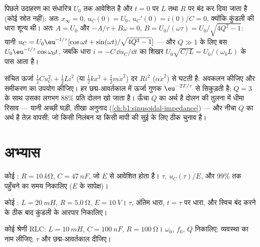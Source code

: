 \begin{example}[आरंभिक शर्तें]\label{ex:b1:transient-regimes:ic}
पिछले उदाहरण का संधारित्र $U_0$ तक आवेशित है और
$t = 0$ पर $L$ तथा $R$ पर बंद कर दिया जाता है (कोई स्रोत नहीं): अतः $x_\infty = 0$,
$u_C(0) = U_0$, $u_C'(0) = i(0)/C = 0$, क्योंकि कुंडली की धारा शून्य थी।
अतः $A = U_0$ और $-A/\tau + B\omega = 0$, $B = U_0/(\omega\tau) =
U_0/\sqrt{4Q^2 - 1}$: यानी $u_C = U_0\eu^{-t/\tau}[\cos\omega t + \sin(\omega
t)/\sqrt{4Q^2 - 1}]$ --- और $Q \gg 1$ के लिए बस $U_0\eu^{-t/\tau}\cos\omega_0 t$,
जबकि धारा $i = -C\,\dd u_C/\dd t$ का शिखर $U_0\sqrt{C/L} =
U_0/(\omega_0 L)$ के पास आता है।
\end{example}

\begin{remark}[ऊर्जा]\label{rem:b1:transient-regimes:energy}
संचित ऊर्जा $\tfrac12 Cu_C^2 + \tfrac12 Li^2$ (या $\tfrac12 kx^2
+ \tfrac12 m\dot x^2$) दर $Ri^2$ ($\alpha\dot x^2$) से घटती है:
अवकलन कीजिए और समीकरण का उपयोग कीजिए। हर छद्म-आवर्तकाल में ऊर्जा
गुणक $\eu^{-2T/\tau}$ से सिकुड़ती है; $Q = 3$ के साथ उसका लगभग $88\%$
प्रति दोलन खो जाता है। ऊँचा $Q$ का अर्थ है दोलन की तुलना में धीमा रिसाव ---
यानी अच्छी घड़ी, तीखा अनुनाद
(\cref{ch:b1:sinusoidal-impedance}) --- और नीचा $Q$ का अर्थ है तेज़ वापसी:
जो किसी निलंबन या किसी मापी की सुई के लिए ठीक चुनाव है।
\end{remark}

\section{अभ्यास}

\begin{exercise}[$\star$]\label{exo:b1:transient-regimes:1}
कोई : $R = \qty{10}{k\ohm}$, $C = \qty{47}{nF}$, जो
$E$ से आवेशित होता है। $\tau$, $u_C(\tau)/E$, और $99\%$ तक पहुँचने का समय निकालिए ($E$ के सापेक्ष)।
\end{exercise}

\begin{exercise}[$\star$]\label{exo:b1:transient-regimes:2}
कोई : $L = \qty{20}{mH}$, $R = \qty{5.0}{\ohm}$, $E = \qty{10}{V}$।
$\tau$, अंतिम धारा, $t = \tau$ पर धारा, और स्विच बंद करने के ठीक बाद कुंडली
के आरपार  निकालिए।
\end{exercise}

\begin{exercise}[$\star$]\label{exo:b1:transient-regimes:3}
कोई श्रेणी RLC: $L = \qty{10}{mH}$, $C = \qty{100}{nF}$, $R = \qty{100}{\ohm}$।
$\omega_0$, $f_0$, $Q$ निकालिए; व्यवस्था का नाम लीजिए; $\tau$ और
छद्म-आवर्तकाल दीजिए।
\end{exercise}

